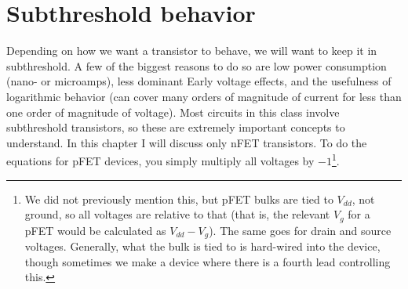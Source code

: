 \documentclass[main]{subfiles}
\begin{document}

\section{Subthreshold behavior}
Depending on how we want a transistor to behave, we will want to keep it in subthreshold. A few of the biggest reasons to do so are low power consumption (nano- or microamps), less dominant Early voltage effects, and the usefulness of logarithmic behavior (can cover many orders of magnitude of current for less than one order of magnitude of voltage). Most circuits in this class involve subthreshold transistors, so these are extremely important concepts to understand. In this chapter I will discuss only nFET transistors. To do the equations for pFET devices, you simply multiply all voltages by $-1$\footnote{We did not previously mention this, but pFET bulks are tied to $V_{dd}$, not ground, so all voltages are relative to that (that is, the relevant $V_{g}$ for a pFET would be calculated as $V_{dd} - V_{g}$). The same goes for drain and source voltages. Generally, what the bulk is tied to is hard-wired into the device, though sometimes we make a device where there is a fourth lead controlling this.}.
\end{document}
